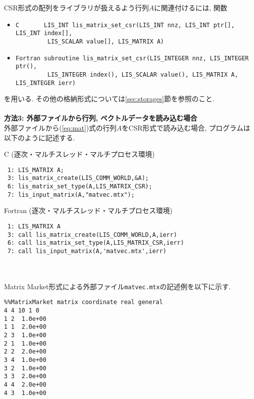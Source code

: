 \documentclass[a4paper]{jarticle}
\begin{document}
{{CSR形式の配列をライブラリが扱えるよう行列$A$に関連付けるには, 関数
\begin{itemize}
\item \verb|C       LIS_INT lis_matrix_set_csr(LIS_INT nnz, LIS_INT ptr[], LIS_INT index[],|\\
      \verb|         LIS_SCALAR value[], LIS_MATRIX A)|
\item \verb|Fortran subroutine lis_matrix_set_csr(LIS_INTEGER nnz, LIS_INTEGER ptr(),|\\
      \verb|         LIS_INTEGER index(), LIS_SCALAR value(), LIS_MATRIX A, LIS_INTEGER ierr)|
\end{itemize}
を用いる. 
その他の格納形式については\ref{sec:storages}節を参照のこと. 
\\ \\
{\bf 方法3: 外部ファイルから行列, ベクトルデータを読み込む場合}\\
外部ファイルから(\ref{eq:mat})式の行列$A$をCSR形式で読み込む場合, プログラムは以下のように記述する. 
\begin{itembox}[l]{C (逐次・マルチスレッド・マルチプロセス環境)}
\small
\begin{verbatim}
 1: LIS_MATRIX A;
 3: lis_matrix_create(LIS_COMM_WORLD,&A); 
 6: lis_matrix_set_type(A,LIS_MATRIX_CSR); 
 7: lis_input_matrix(A,"matvec.mtx"); 
\end{verbatim}
\end{itembox}
\begin{itembox}[l]{Fortran (逐次・マルチスレッド・マルチプロセス環境)}
\small
\begin{verbatim}
 1: LIS_MATRIX A
 3: call lis_matrix_create(LIS_COMM_WORLD,A,ierr) 
 6: call lis_matrix_set_type(A,LIS_MATRIX_CSR,ierr) 
 7: call lis_input_matrix(A,'matvec.mtx',ierr) 
\end{verbatim}
\end{itembox}
\\ \\
Matrix Market形式による外部ファイル{\tt matvec.mtx}の記述例を以下に示す. 
{\small
\begin{verbatim}
%%MatrixMarket matrix coordinate real general
4 4 10 1 0
1 2  1.0e+00
1 1  2.0e+00
2 3  1.0e+00
2 1  1.0e+00
2 2  2.0e+00
3 4  1.0e+00
3 2  1.0e+00
3 3  2.0e+00
4 4  2.0e+00
4 3  1.0e+00
\end{verbatim}
}

}}
\end{document}
